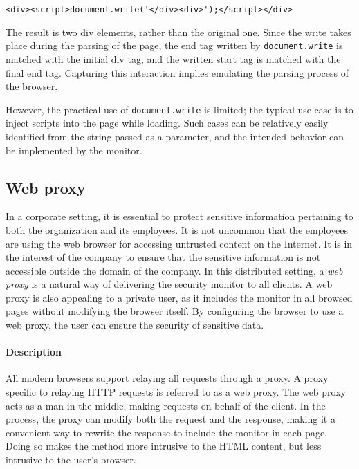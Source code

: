 \documentclass{llncs}
\newcommand{\todo}[1]{\colorbox{red}{\textcolor{white}{\sffamily\bfseries\scriptsize TODO}} \textcolor{red}{#1} \textcolor{red}{$\blacktriangleleft$}}
\begin{document}
\begin{lstlisting}[language=langsmall]
<div><script>document.write('</div><div>');</script></div>
\end{lstlisting}

The result is two div elements, rather than the original one. Since the write
takes place during the parsing of the page, the end tag written by
\lstinline{document.write} is matched with the initial div tag, and the written
start tag is matched with the final end tag. Capturing this interaction
implies emulating the parsing process of the browser.

However, the practical use of \lstinline{document.write} is limited; the
typical use case is to inject scripts into the page while loading. Such cases
can be relatively easily identified from the string passed as a parameter, and
the intended behavior can be implemented by the monitor.



\vspace{-.4cm}
\subsection{Web proxy}
\label{sec:arch-web}
\vspace{-.2cm}

In a corporate setting, it is essential to protect 
sensitive information pertaining to both the organization and its employees. 
It is not uncommon that the employees are using the web browser for accessing untrusted content on 
the Internet. It is in the interest of the company to ensure that 
the sensitive information is not accessible outside the domain of the company.
In this distributed setting, a \emph{web proxy} is a natural way of delivering 
the security monitor to all clients. 
%
A web proxy is also appealing to a private user, as it includes the monitor in all browsed pages without modifying 
the browser itself. By configuring the browser to use a web proxy, the user can ensure the security 
of sensitive data.

\vspace{-.4cm}
\paragraph{Description}
All modern browsers support %
relaying all requests through a proxy.
A proxy specific to relaying HTTP requests is referred to as a web proxy.
The web proxy acts as a man-in-the-middle, making 
requests on behalf of the client. 
In the process, the proxy can
modify both the request and the response, making it 
a convenient way to rewrite the response to include 
the monitor in each page. Doing so makes the method more 
intrusive to the HTML content, but less intrusive to the user's browser. 
\end{document}

